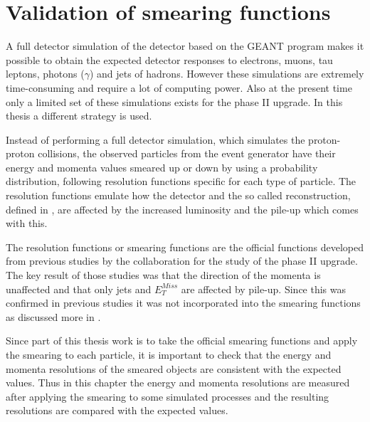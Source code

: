 \chapter{Validation of smearing functions}\label{cha:vali}
A full detector simulation of the \abbrATLAS detector based on the GEANT \citep{Geant4} program makes it possible to obtain the expected detector responses to electrons, muons, tau leptons, photons ($\gamma$) and jets of hadrons. However these simulations are extremely time-consuming and require a lot of computing power. Also at the present time only a limited set of these simulations exists for the \abbrATLAS phase II upgrade. In this thesis a different strategy is used. 

Instead of performing a full detector simulation, which simulates the proton-proton collisions, the observed particles from the event generator have their energy and momenta values smeared up or down by using a probability distribution, following resolution functions specific for each type of particle. The resolution functions emulate how the detector and the so called reconstruction, defined in , are affected by the increased luminosity and the pile-up which comes with this. 

The resolution functions or smearing functions are the official functions developed from previous studies \citep{ATLAS:LOI2, ATL-PHYS-PUB-2013-004} by the \abbrATLAS collaboration for the study of the \abbrATLAS phase II upgrade. The key result of those studies was that the direction of the momenta is unaffected and that only jets and $E^{Miss}_T$ are affected by pile-up. Since this was confirmed in previous studies it was not incorporated into the smearing functions as discussed more in .

Since part of this thesis work is to take the official \abbrATLAS smearing functions and apply the smearing to each particle, it is important to check that the energy and momenta resolutions of the smeared objects are consistent with the expected values. Thus in this chapter the energy and momenta resolutions are measured after applying the smearing to some simulated processes and the resulting resolutions are compared with the expected values.

\newpage

